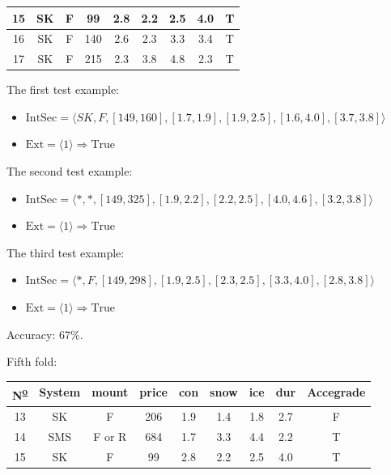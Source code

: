 \documentclass[12pt]{report}
\begin{document}
\begin{solution}
\begin{enumerate}
\begin{table}[H]
\begin{tabular}{|c|c|c|c|c|c|c|c|c|}
        15 & SK     & F      & 99    & 2.8 & 2.2  & 2.5 & 4.0 & T         \\ \hline
        16 & SK     & F      & 140   & 2.6 & 2.3  & 3.3 & 3.4 & T         \\ \hline
        17 & SK     & F      & 215   & 2.3 & 3.8  & 4.8 & 2.3 & T         \\ \hline
        \end{tabular}
        \end{table}
      The first test example:
      \begin{itemize}
        \item $\text{IntSec} = \langle SK, F, [ 149, 160], [1.7, 1.9], [1.9, 2.5], [1.6, 4.0], [3.7, 3.8] \rangle$
        \item $\text{Ext} = \langle 1 \rangle \Longrightarrow \text{True}$
      \end{itemize}
      The second test example:
      \begin{itemize}
        \item $\text{IntSec} = \langle *, *, [ 149, 325], [1.9, 2.2], [2.2, 2.5], [4.0, 4.6], [3.2, 3.8] \rangle$
        \item $\text{Ext} = \langle 1 \rangle \Longrightarrow \text{True}$
      \end{itemize}
      The third test example:
      \begin{itemize}
        \item $\text{IntSec} = \langle *, F, [ 149, 298], [1.9, 2.5], [2.3, 2.5], [3.3, 4.0], [2.8, 3.8] \rangle$
        \item $\text{Ext} = \langle 1 \rangle \Longrightarrow \text{True}$
      \end{itemize}
      Accuracy: $67\%$.
      \par 
      Fifth fold:
      \begin{table}[H]
        \centering
        \begin{tabular}{|c|c|c|c|c|c|c|c|c|}
        \hline
        N\textsuperscript{\underline{o}} & System & mount  & price & con & snow & ice & dur & Accegrade \\ \hline
        13 & SK     & F      & 206   & 1.9 & 1.4  & 1.8 & 2.7 & F         \\ \hline
        14 & SMS    & F or R & 684   & 1.7 & 3.3  & 4.4 & 2.2 & T         \\ \hline
        15 & SK     & F      & 99    & 2.8 & 2.2  & 2.5 & 4.0 & T         \\ \hline
        \end{tabular}

\end{table}
\end{enumerate}
\end{solution}
\end{document}
